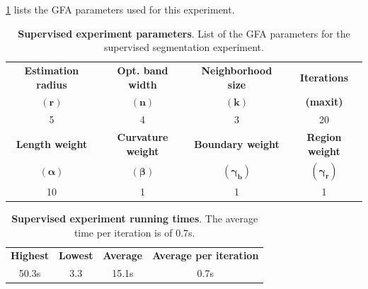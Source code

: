 \documentclass[review]{siamart220329}
\begin{document}
\cref{tab:coco-experiment-parameter} lists the GFA parameters used for this
experiment.
%
%
\begin{table}
\center
\footnotesize
\caption{\textbf{Supervised experiment parameters}. List of the GFA
parameters for the supervised segmentation
experiment.}
\label{tab:coco-experiment-parameter}
\begin{tabular}{cccc}
\textbf{Estimation radius} & \textbf{Opt. band width} & \textbf{Neighborhood size} & \textbf{Iterations} \\
$\mathbf{(r)}$ & $\mathbf{(n)}$ & $\mathbf{(k)}$ & \textbf{(maxit)}\\
5 & 4 & 3 & 20\\[1em]
\textbf{Length weight} & \textbf{Curvature weight} & \textbf{Boundary weight} & \textbf{Region weight}\\
$\boldsymbol{(\alpha)}$ & $\boldsymbol{(\beta)}$ & $\boldsymbol{(\gamma_b)}$ & $\boldsymbol{(\gamma_r)}$\\
10 & 1 & 1 & 1
\end{tabular}
\end{table}
%
%
\begin{table}
\footnotesize
\caption{\textbf{Supervised experiment running times}. The average time per
iteration is of $0.7$s.}
\label{tab:coco-experiment-running-time}
\center
\begin{tabular}{cccc}
\textbf{Highest} & \textbf{Lowest} & \textbf{Average} & \textbf{Average per iteration} \\
50.3s & 3.3 & 15.1s & 0.7s\\
\end{tabular}
\end{table}
%
%
\end{document}
